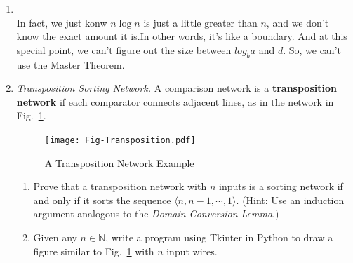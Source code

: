 \documentclass[12pt,a4paper]{article}
\makeatletter
\newtheorem*{solution}{Solution}
\theoremstyle{definition}
\renewenvironment{solution}[1][Solution] {\par\pushQED{\qed}\normalfont\topsep6\p@\@plus6\p@\relax\trivlist\item[\hskip\labelsep\bfseries#1\@addpunct{.}]\ignorespaces}{\popQED\endtrivlist\@endpefalse} \makeatother
\makeatother
\begin{document}
\begin{enumerate}
\begin{solution}
\begin{enumerate}
              \\ In fact, we just konw $n\log n$ is just a little greater than $n$, and we don't know the exact amount it is.In other words, it's like a boundary. And at this special point, we can't figure out the size between $log_b a$ and $d$. So, we can't use the Master Theorem.
    \end{enumerate}
\end{solution}
\item
\textit{Transposition Sorting Network.} A comparison network is a \textbf{transposition network}  if each comparator connects adjacent lines, as in the network in Fig.~\ref{Fig-Transposition}.

\begin{figure}[htbp]
    \centering
    \texttt{[image: Fig-Transposition.pdf]}
    \caption{A Transposition Network Example}\label{Fig-Transposition}
\end{figure}

\begin{enumerate}
\item Prove that a transposition network with $n$ inputs is a sorting network if and only if it sorts the sequence $\langle n, n-1, \cdots, 1 \rangle$. {\color{blue}(Hint: Use an induction argument analogous to the \emph{Domain Conversion Lemma}.)}
\item {\color{red}{(Optional Sub-question with Bonus)}} Given any $n \in \mathbb{N}$, write a program using Tkinter in Python to draw a figure similar to Fig.~\ref{Fig-Transposition} with $n$ input wires.
\end{enumerate}
\end{enumerate}
\end{document}
